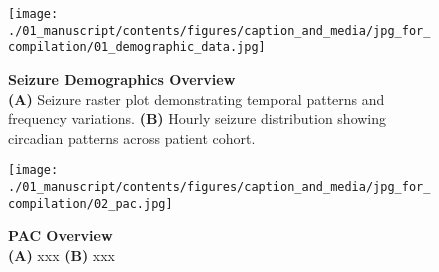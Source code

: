 
\begin{figure*}[h!]
    \centering
    \texttt{[image: ./01\_manuscript/contents/figures/caption\_and\_media/jpg\_for\_compilation/01\_demographic\_data.jpg]}
    \caption{\textbf{Seizure Demographics Overview}\\
\smallskip
\textbf{(A)} Seizure raster plot demonstrating temporal patterns and frequency variations.
\textbf{(B)} Hourly seizure distribution showing circadian patterns across patient cohort.}
    \label{fig:1_demographic_data}
\end{figure*}

\begin{figure*}[htbp]
    \centering
    \texttt{[image: ./01\_manuscript/contents/figures/caption\_and\_media/jpg\_for\_compilation/02\_pac.jpg]}
    \caption{\textbf{PAC Overview}\\
\smallskip
\textbf{(A)} xxx
\textbf{(B)} xxx}
    \label{fig:2_pac}
\end{figure*}


